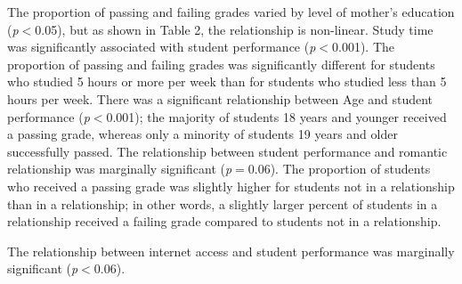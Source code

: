 \documentclass[sigconf]{acmart}
\begin{document}

The proportion of passing and failing grades varied by level of mother's 
education (\textit{p}$<$0.05), but as shown in Table 2, the relationship is 
non-linear. Study time was significantly associated with student performance 
(\textit{p}$<$0.001). The proportion of passing and failing grades was 
significantly different for students who studied 5 hours or more per week 
than for students who studied less than 5 hours per week. There was a 
significant relationship between Age and student performance 
(\textit{p}$<$0.001); the majority of students 18 years and younger received
a passing grade, whereas only a minority of students 19 years and older
successfully passed. The relationship between student performance and romantic 
relationship was marginally significant (\textit{p}$=$0.06). The proportion of 
students who received a passing grade was slightly higher for students not in 
a relationship than in a relationship; in other words, a slightly larger
percent of students in a relationship received a failing grade compared 
to students not in a relationship. 

The relationship
between internet access and student performance was marginally significant 
(\textit{p}$<$0.06).

\end{document}
